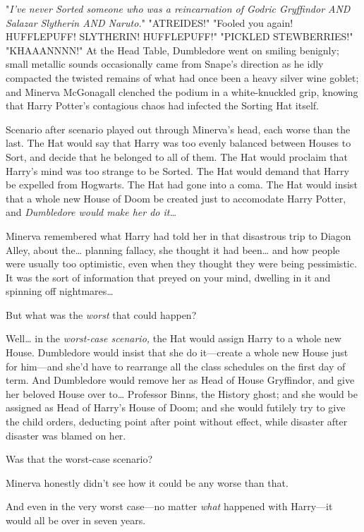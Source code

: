 "\emph{I've never Sorted someone who was a reincarnation of Godric Gryffindor 
AND Salazar Slytherin AND Naruto.}"
\sbreak
"ATREIDES!"
\sbreak
"Fooled you again! HUFFLEPUFF! SLYTHERIN! HUFFLEPUFF!"
\sbreak
"PICKLED STEWBERRIES!"
\sbreak
"KHAAANNNN!"
\sbreak
At the Head Table, Dumbledore went on smiling benignly; small metallic sounds 
occasionally came from Snape's direction as he idly compacted the twisted 
remains of what had once been a heavy silver wine goblet; and Minerva 
McGonagall clenched the podium in a white-knuckled grip, knowing that Harry 
Potter's contagious chaos had infected the Sorting Hat itself.

Scenario after scenario played out through Minerva's head, each worse than the 
last. The Hat would say that Harry was too evenly balanced between Houses to 
Sort, and decide that he belonged to all of them. The Hat would proclaim that 
Harry's mind was too strange to be Sorted. The Hat would demand that Harry be 
expelled from Hogwarts. The Hat had gone into a coma. The Hat would insist that 
a whole new House of Doom be created just to accomodate Harry Potter, and 
\emph{Dumbledore would make her do it{\ldots}}

Minerva remembered what Harry had told her in that disastrous trip to Diagon 
Alley, about the{\ldots} planning fallacy, she thought it had been{\ldots} and 
how people were usually too optimistic, even when they thought they were being 
pessimistic. It was the sort of information that preyed on your mind, dwelling 
in it and spinning off nightmares{\ldots}

But what was the \emph{worst} that could happen?

Well{\ldots} in the \emph{worst-case scenario,} the Hat would assign Harry to a 
whole new House. Dumbledore would insist that she do it---create a whole new 
House just for him---and she'd have to rearrange all the class schedules on the 
first day of term. And Dumbledore would remove her as Head of House Gryffindor, 
and give her beloved House over to{\ldots} Professor Binns, the History ghost; 
and she would be assigned as Head of Harry's House of Doom; and she would 
futilely try to give the child orders, deducting point after point without 
effect, while disaster after disaster was blamed on her.

Was that the worst-case scenario?

Minerva honestly didn't see how it could be any worse than that.

And even in the very worst case---no matter \emph{what} happened with 
Harry---it would all be over in seven years.

